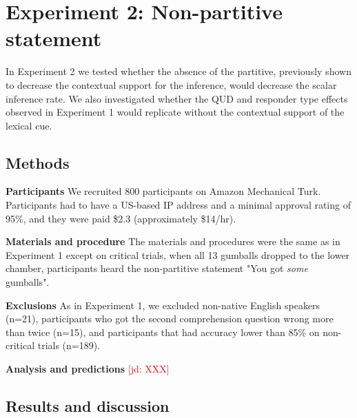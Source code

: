 \documentclass[10pt,letterpaper]{article}
\newcommand{\jd}[1]{\textcolor{Red}{[jd: #1]}}
\begin{document}
\section{Experiment 2: Non-partitive statement}

In Experiment 2 we tested whether the absence of the partitive, previously shown to decrease the contextual support for the inference, would decrease the scalar inference rate. We also investigated whether the QUD and responder type effects observed in Experiment 1 would replicate without the contextual support of the lexical cue.

\subsection{Methods}

\noindent \textbf{Participants} We recruited 800 participants on Amazon Mechanical Turk. Participants had to have a US-based IP address and a minimal approval rating of 95\%, and they were paid \$2.3 (approximately \$14/hr).

\noindent \textbf{Materials and procedure} The materials and procedures were the same as in Experiment 1 except on critical trials, when all 13 gumballs dropped to the lower chamber, participants heard the non-partitive statement "You got \textit{some} gumballs".

\noindent \textbf{Exclusions} As in Experiment 1, we excluded non-native English speakers (n=21), participants who got the second comprehension question wrong more than twice (n=15), and participants that had accuracy lower than 85\% on non-critical trials (n=189).

\noindent \textbf{Analysis and predictions}
\jd{XXX}

\subsection{Results and discussion}
\end{document}
